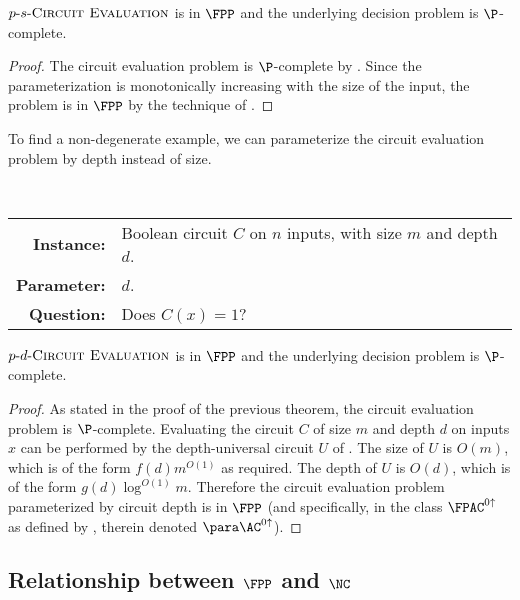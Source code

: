 \documentclass{article}
\newcommand{\dash}{\textnormal{-}}
\begin{document}
\begin{theorem}
  $p \dash s \dash \textsc{Circuit Evaluation}$ is in $\FPP$ and the underlying decision problem is $\P$-complete.
\end{theorem}
\begin{proof}
  The circuit evaluation problem is $\P$-complete by \autocite{ladner75}.
  Since the parameterization is monotonically increasing with the size of the input, the problem is in $\FPP$ by the technique of \autocite[Proposition~1.7]{fg06}.
\end{proof}

To find a non-degenerate example, we can parameterize the circuit evaluation problem by depth instead of size.

\begin{definition}[$p \dash d \dash \textsc{Circuit Evaluation}$]
  \mbox{} \\
  \begin{tabular}{r p{9.2cm}}
    \textbf{Instance:} & Boolean circuit $C$ on $n$ inputs, with size $m$ and depth $d$. \\
    \textbf{Parameter:} & $d$. \\
    \textbf{Question:} & Does $C(x) = 1$?
  \end{tabular}
\end{definition}

\begin{theorem}\label{thm:cvpdepth}
  $p \dash d \dash \textsc{Circuit Evaluation}$ is in $\FPP$ and the underlying decision problem is $\P$-complete.
\end{theorem}
\begin{proof}
  As stated in the proof of the previous theorem, the circuit evaluation problem is $\P$-complete.
  Evaluating the circuit $C$ of size $m$ and depth $d$ on inputs $x$ can be performed by the depth-universal circuit $U$ of \autocite{ch85}.
  The size of $U$ is $O(m)$, which is of the form $f(d) m^{O(1)}$ as required.
  The depth of $U$ is $O(d)$, which is of the form $g(d) \log^{O(1)} m$.
  Therefore the circuit evaluation problem parameterized by circuit depth is in $\FPP$ (and specifically, in the class $\FPAC^{0 \uparrow}$ as defined by \autocite{bst15}, therein denoted $\para\AC^{0 \uparrow}$).
\end{proof}

\subsection{Relationship between \texorpdfstring{$\FPP$}{FPP} and \texorpdfstring{$\NC$}{NC}}
\end{document}
